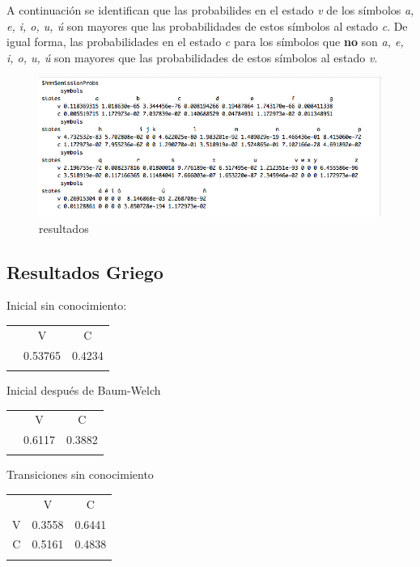 \documentclass[]{article}
\begin{document}
A continuación se identifican que las probabilides en el estado \emph{v}
de los símbolos \emph{a, e, i, o, u, ú} son mayores que las
probabilidades de estos símbolos al estado \emph{c}. De igual forma, las
probabilidades en el estado \emph{c} para los símbolos que \textbf{no}
son \emph{a, e, i, o, u, ú} son mayores que las probabilidades de estos
símbolos al estado \emph{v}.

\begin{figure}[htbp]
\centering
\includegraphics{salida_vocales.png}
\caption{resultados}
\end{figure}

\subsection{Resultados Griego}\label{resultados-griego}

Inicial sin conocimiento:

\begin{longtable}[c]{@{}ccc@{}}
\toprule\addlinespace
& V & C
\\\addlinespace
\midrule\endhead
& 0.53765 & 0.4234
\\\addlinespace
\bottomrule
\end{longtable}

Inicial después de Baum-Welch

\begin{longtable}[c]{@{}ccc@{}}
\toprule\addlinespace
& V & C
\\\addlinespace
\midrule\endhead
& 0.6117 & 0.3882
\\\addlinespace
\bottomrule
\end{longtable}

Transiciones sin conocimiento

\begin{longtable}[c]{@{}ccc@{}}
\toprule\addlinespace
& V & C
\\\addlinespace
\midrule\endhead
V & 0.3558 & 0.6441
\\\addlinespace
C & 0.5161 & 0.4838
\\\addlinespace
\bottomrule
\end{longtable}
\end{document}
